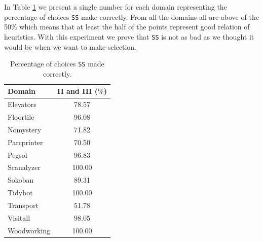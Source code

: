 \newpage

In Table \ref{tb:per_ss_made_correctly} we present a single number for each domain representing the percentage of choices \texttt{SS} make correctly. From all the domains all are above of the 50$\%$ which means that at least the half of the points represent good relation of heuristics. With this experiment we prove that \texttt{SS} is not as bad as we thought it would be when we want to make selection.

\begin{table}[!htb]
\centering
\begin{tabular}{lc}
\hline
Domain      & II and III ($\%$) \\ \hline
Elevators   & 78.57    \\
Floortile   & 96.08    \\
Nomystery   & 71.82    \\
Parcprinter & 70.50    \\
Pegsol      & 96.83    \\
Scanalyzer  & 100.00   \\
Sokoban     & 89.31    \\
Tidybot     & 100.00   \\
Transport   & 51.78    \\
Visitall    & 98.05    \\
Woodworking & 100.00   \\ \hline
\end{tabular}
\caption{Percentage of choices \texttt{SS} made correctly.}
\label{tb:per_ss_made_correctly}
\end{table}

\clearpage